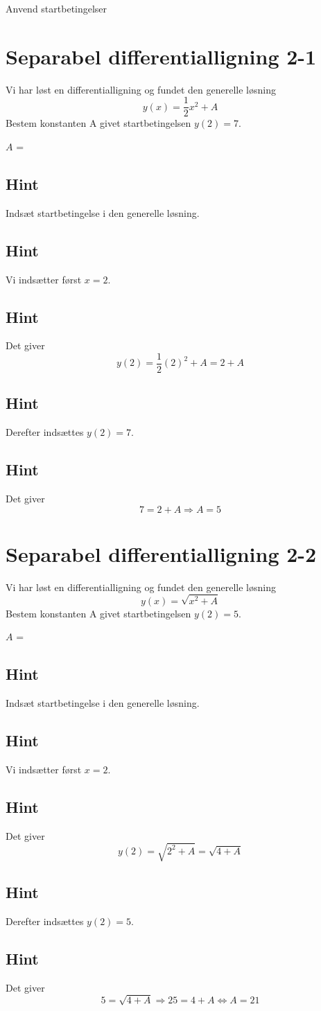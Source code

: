 \documentclass{article}
\newenvironment{exercise}[1]{\newpage\section{#1}}{}
\newcommand{\answerbox}[1]{\fbox{$#1$}}
\newcommand{\hint}{\subsection*{Hint}}
\begin{document}
Anvend startbetingelser
\tableofcontents

\newpage

\begin{exercise}{Separabel differentialligning 2-1}

	
	Vi har løst en differentialligning og fundet den generelle løsning
	\[
	y(x) = \frac{1}{2}x^2 + A
	\]
	Bestem konstanten A givet startbetingelsen $y(2)=7$.
	
	$A$ = \answerbox{5}
	
	\hint
	
	Indsæt startbetingelse i den generelle løsning. 

	
	\hint
	
	Vi indsætter først $x=2$.
	
	\hint
	
	Det giver
	\[
	y(2)= \frac{1}{2}(2)^2+A = 2 + A
	\]
	
	\hint
	
	Derefter indsættes $y(2)=7$.

	\hint 
	
	Det giver 
		\[
	7 = 2 + A \Rightarrow A = 5
	\]
	
\end{exercise}

\newpage

\begin{exercise}{Separabel differentialligning 2-2}

	
	Vi har løst en differentialligning og fundet den generelle løsning
	\[
	y(x) = \sqrt{x^2 + A}
	\]
	Bestem konstanten A givet startbetingelsen $y(2)=5$.
	
	$A$ = \answerbox{21}
	
	\hint
	
	Indsæt startbetingelse i den generelle løsning. 
	
	
	\hint
	
	Vi indsætter først $x=2$.
	
	\hint
	
	Det giver
	\[
	y(2)= \sqrt{2^2 + A} = \sqrt{4 + A}
	\]
	
	\hint
	
	Derefter indsættes $y(2)=5$.
	
	\hint 
	
	Det giver 
	\[
	5 = \sqrt{4 + A} \Rightarrow 25 = 4 + A \Leftrightarrow A = 21	
	\]
	
\end{exercise}

\newpage
\end{document}
